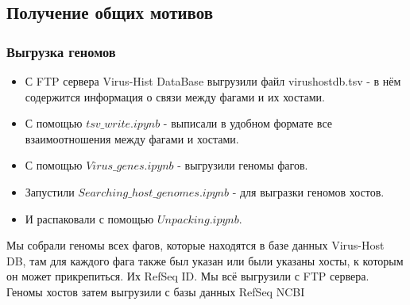 \documentclass[14pt]{extarticle}
\begin{document}
\begin{center}
      \item \subsection{Получение общих мотивов}
      \item  \subsubsection{Выгрузка геномов}
\end{center}
    \begin{itemize}
        \item С FTP сервера Virus-Hist DataBase выгрузили файл virushostdb.tsv - в нём содержится информация о связи 
        между фагами и их хостами.
        \item С помощью \(tsv\_write.ipynb\) - выписали в удобном формате все взаимоотношения между фагами и 
        хостами.
        \item С помощью \(Virus\_genes.ipynb\) - выгрузили геномы фагов.
        \item Запустили \(Searching\_host\_genomes.ipynb\) - для выгразки геномов хостов.
        \item И распаковали с помощью \(Unpacking.ipynb\).
    \end{itemize}
    
    \par{Мы собрали геномы всех фагов, которые находятся в базе данных Virus-Host DB, там для каждого фага также был 
    указан или были указаны хосты, к которым он может прикрепиться. Их RefSeq ID. Мы всё выгрузили с FTP сервера. Геномы
    хостов затем выгрузили с базы данных RefSeq NCBI}
\end{document}
